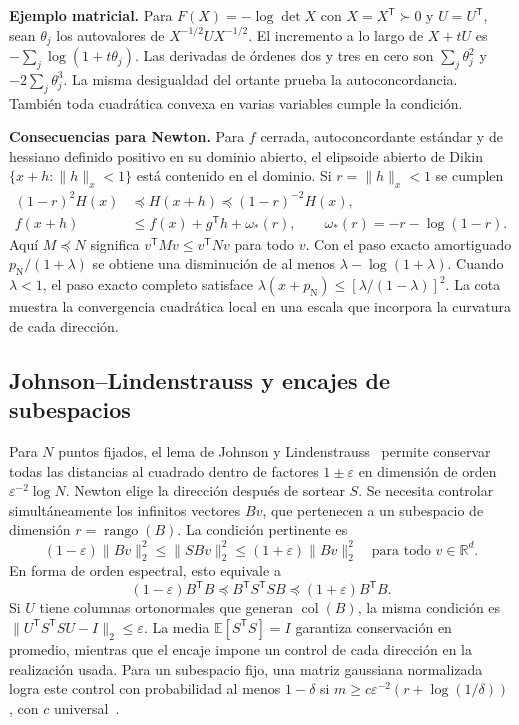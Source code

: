 \documentclass[11pt,a4paper]{article}
\newcommand{\R}{\mathbb R}
\newcommand{\E}{\mathbb E}
\newcommand{\T}{^{\mathsf T}}
\newcommand{\eps}{\varepsilon}
\newcommand{\nrm}[1]{\lVert #1\rVert}
\newcommand{\pN}{p_{\mathrm N}}
\DeclareMathOperator{\col}{col}
\newcommand{\tema}[1]{\smallskip\par\textbf{#1}\enspace\ignorespaces}
\begin{document}
\tema{Ejemplo matricial.}
Para $F(X)=-\log\det X$ con $X=X\T\succ0$ y $U=U\T$, sean $\theta_j$ los autovalores de $X^{-1/2}UX^{-1/2}$. El incremento a lo largo de $X+tU$ es $-\sum_j\log(1+t\theta_j)$. Las derivadas de órdenes dos y tres en cero son $\sum_j\theta_j^2$ y $-2\sum_j\theta_j^3$. La misma desigualdad del ortante prueba la autoconcordancia. También toda cuadrática convexa en varias variables cumple la condición.

\tema{Consecuencias para Newton.}
Para $f$ cerrada, autoconcordante estándar y de hessiano definido positivo en su dominio abierto, el elipsoide abierto de Dikin $\{x+h:\nrm h_x<1\}$ está contenido en el dominio. Si $r=\nrm h_x<1$ se cumplen~\cite[sec.~9.6]{BV}
\begin{align}
 (1-r)^2H(x)&\preceq H(x+h)\preceq(1-r)^{-2}H(x),\label{eq:hesssc}\\
 f(x+h)&\le f(x)+g\T h+\omega_*(r),\qquad \omega_*(r)=-r-\log(1-r).\label{eq:valsc}
\end{align}
Aquí $M\preceq N$ significa $v\T Mv\le v\T Nv$ para todo $v$. Con el paso exacto amortiguado $\pN/(1+\lambda)$ se obtiene una disminución de al menos $\lambda-\log(1+\lambda)$. Cuando $\lambda<1$, el paso exacto completo satisface $\lambda(x+\pN)\le[\lambda/(1-\lambda)]^2$. La cota muestra la convergencia cuadrática local en una escala que incorpora la curvatura de cada dirección.

\subsection{Johnson--Lindenstrauss y encajes de subespacios}
Para $N$ puntos fijados, el lema de Johnson y Lindenstrauss~\cite{JL84} permite conservar todas las distancias al cuadrado dentro de factores $1\pm\eps$ en dimensión de orden $\eps^{-2}\log N$. Newton elige la dirección después de sortear $S$. Se necesita controlar simultáneamente los infinitos vectores $Bv$, que pertenecen a un subespacio de dimensión $r=\operatorname{rango}(B)$. La condición pertinente es
\begin{equation}
 (1-\eps)\nrm{Bv}_2^2\le\nrm{SBv}_2^2\le(1+\eps)\nrm{Bv}_2^2
 \quad\text{para todo }v\in\R^d.\label{eq:encaje}
\end{equation}
En forma de orden espectral, esto equivale a
\begin{equation}
 (1-\eps)B\T B\preceq B\T S\T SB\preceq(1+\eps)B\T B.\label{eq:loewner}
\end{equation}
Si $U$ tiene columnas ortonormales que generan $\col(B)$, la misma condición es $\nrm{U\T S\T SU-I}_2\le\eps$. La media $\E[S\T S]=I$ garantiza conservación en promedio, mientras que el encaje impone un control de cada dirección en la realización usada. Para un subespacio fijo, una matriz gaussiana normalizada logra este control con probabilidad al menos $1-\delta$ si $m\ge c\eps^{-2}(r+\log(1/\delta))$, con $c$ universal~\cite{MT20}.
\end{document}
